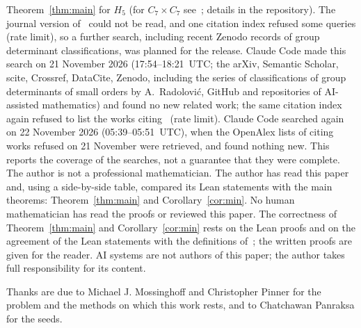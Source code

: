 \documentclass[11pt]{article}
\theoremstyle{definition}
\theoremstyle{remark}
\begin{document}
Theorem~\ref{thm:main} for $H_5$ (for $C_7\times C_7$ see~\cite{pan49}; details
in the repository). The journal version of~\cite{mp} could not be
read, and one citation index refused some queries (rate limit), so a further
search, including recent Zenodo records of group determinant classifications,
was planned for the release. Claude Code made this search on 21 November 2026 (17:54--18:21~UTC; the arXiv, Semantic Scholar, scite, Crossref, DataCite, Zenodo, including the series of classifications of group determinants of small orders by A.~Radolovi\'c, GitHub and repositories of AI-assisted mathematics) and found no new related work; the same citation index again refused to list the works citing~\cite{mp} (rate limit). Claude Code searched again on 22 November 2026 (05:39--05:51~UTC), when the OpenAlex lists of citing works refused on 21 November were retrieved, and found nothing new. This reports the
coverage of the searches, not a guarantee that they were complete. The author
is not a professional mathematician. The author has read this paper and, using a side-by-side table, compared its Lean statements with the main theorems: Theorem~\ref{thm:main} and Corollary~\ref{cor:min}. No human mathematician has
read the proofs or reviewed this paper. The correctness of
Theorem~\ref{thm:main} and Corollary~\ref{cor:min} rests on the Lean proofs and
on the agreement of the Lean statements with the definitions of~\cite{mp}; the
written proofs are given for the reader. AI systems are not authors of this
paper; the author takes full responsibility for its content.

\medskip
\noindent Thanks are due to Michael J. Mossinghoff and Christopher Pinner for
the problem and the methods on which this work rests, and to Chatchawan
Panraksa for the seeds.
\end{document}

